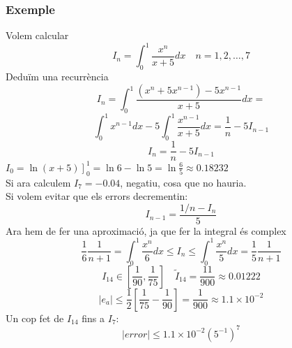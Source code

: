 \documentclass{article}
\begin{document}
\subsubsection{Exemple}
Volem calcular
$$I_n = \int_0^1 \frac{x^n}{x+5} dx\quad n = 1, 2, \dots, 7$$
Deduïm una recurrència
$$I_n = \int_0^1 \frac{(x^n + 5x^{n-1}) - 5x^{n-1}}{x + 5}dx =$$
$$\int_0^1 x^{n-1}dx -5\int_0^1 \frac{x^{n-1}}{x+5}dx = \frac{1}{n} - 5I_{n-1}$$
$$I_n = \frac{1}{n} -5I_{n-1}$$
$I_0 = \left. \ln (x+5)\right]_0^1 = \ln 6 -\ln 5 = \ln\frac{6}{5} \approx 0.18232$\\
Si ara calculem $I_7 = -0.04$, negatiu, cosa que no hauria.\\
Si volem evitar que els errors decrementin:
$$I_{n-1} = \frac{1/n - I_n}{5}$$
Ara hem de fer una aproximació, ja que fer la integral és complex
$$\frac{1}{6} \frac{1}{n+1} = \int_0^1 \frac{x^n}{6} dx \le I_n \le \int_0^1 \frac{x^n}{5}dx = \frac{1}{5} \frac{1}{n+1}$$
$$I_{14} \in \left[\frac{1}{90}, \frac{1}{75}\right]\quad \widetilde{I}_{14} = \frac{11}{900} \approx 0.01222$$
$$|e_a| \le \frac{1}{2}\left[ \frac{1}{75} - \frac{1}{90}\right] = \frac{1}{900} \approx 1.1\times 10^{-2}$$
Un cop fet de $I_{14}$ fins a $I_7$:
$$|error| \le 1.1\times 10^{-2} (5^{-1})^7$$
\end{document}
